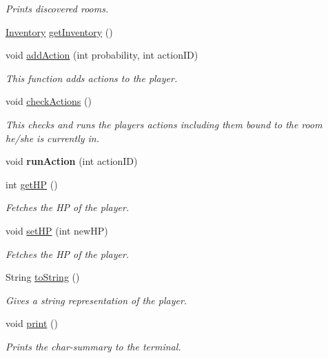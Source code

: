 \begin{DoxyCompactItemize}
\begin{DoxyCompactList}\small\item\em Prints discovered rooms. \end{DoxyCompactList}\item 
\hyperlink{classInventory}{Inventory} \hyperlink{classAvatar_a542d84ae586f4c7ece4c9020a34d001d}{get\+Inventory} ()
\item 
void \hyperlink{classAvatar_a4858e361b655a9abd4772550a33d7efd}{add\+Action} (int probability, int action\+I\+D)
\begin{DoxyCompactList}\small\item\em This function adds actions to the player. \end{DoxyCompactList}\item 
\hypertarget{classAvatar_aec43b383b3ce2b1de5aca785c0196ce5}{}void \hyperlink{classAvatar_aec43b383b3ce2b1de5aca785c0196ce5}{check\+Actions} ()\label{classAvatar_aec43b383b3ce2b1de5aca785c0196ce5}

\begin{DoxyCompactList}\small\item\em This checks and runs the players actions including them bound to the room he/she is currently in. \end{DoxyCompactList}\item 
\hypertarget{classAvatar_a81c81ae610d7720832203dc749b28260}{}void {\bfseries run\+Action} (int action\+I\+D)\label{classAvatar_a81c81ae610d7720832203dc749b28260}

\item 
int \hyperlink{classAvatar_ae639c0e572b3430f319ef5145a33ec1d}{get\+H\+P} ()
\begin{DoxyCompactList}\small\item\em Fetches the H\+P of the player. \end{DoxyCompactList}\item 
void \hyperlink{classAvatar_a45c2faf4d51229d88f528d80199f1e24}{set\+H\+P} (int new\+H\+P)
\begin{DoxyCompactList}\small\item\em Fetches the H\+P of the player. \end{DoxyCompactList}\item 
String \hyperlink{classAvatar_a2fb302eb0410b9ccd2946ac26e93d9ca}{to\+String} ()
\begin{DoxyCompactList}\small\item\em Gives a string representation of the player. \end{DoxyCompactList}\item 
\hypertarget{classAvatar_a44b9098d9f26ad31b23000bb551d43cd}{}void \hyperlink{classAvatar_a44b9098d9f26ad31b23000bb551d43cd}{print} ()\label{classAvatar_a44b9098d9f26ad31b23000bb551d43cd}

\begin{DoxyCompactList}\small\item\em Prints the char-\/summary to the terminal. \end{DoxyCompactList}\end{DoxyCompactItemize}


